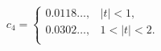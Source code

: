 \[c_{4}=\begin{cases}0.0118\ldots,&\left|t\right|<1,\\
0.0302\ldots,&1<\left|t\right|<2.\\
\end{cases}\]